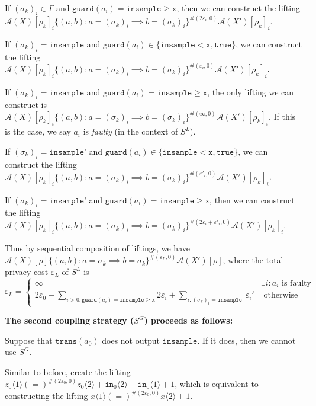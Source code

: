 \documentclass[12pt]{article}
\newcommand{\gguard}[1][x]{\texttt{insample}\geq \texttt{#1}}
\newcommand{\lguard}[1][x]{\texttt{insample} < \texttt{#1}}
\newcommand{\brangle}[1]{\langle #1 \rangle}
\newcommand{\guard}{\texttt{guard}}
\newcommand{\trans}{\texttt{trans}}
\theoremstyle{definition}
\begin{document}
If $(\sigma_k)_i \in \Gamma$ and $\guard(a_i) = \gguard$, then we can construct the lifting $\mathcal{A}(X)[\rho_k]_i\{(a, b): a = (\sigma_k)_i \implies b = (\sigma_k)_i\}^{\#(2\varepsilon_i, 0)}\mathcal{A}(X')[\rho_k]_i$.

If $(\sigma_k)_i = \texttt{insample}$ and $\guard(a_i) \in \{\lguard, \texttt{true}\}$, we can construct the lifting $\mathcal{A}(X)[\rho_k]_i\{(a, b): a = (\sigma_k)_i \implies b = (\sigma_k)_i\}^{\#(\varepsilon_i, 0)}\mathcal{A}(X')[\rho_k]_i$.

If $(\sigma_k)_i = \texttt{insample}$ and $\guard(a_i) = \gguard$, the only lifting we can construct is $\mathcal{A}(X)[\rho_k]_i\{(a, b): a = (\sigma_k)_i \implies b = (\sigma_k)_i\}^{\#(\infty, 0)}\mathcal{A}(X')[\rho_k]_i$. If this is the case, we say $a_i$ is \textit{faulty} (in the context of $S^L$).

If $(\sigma_k)_i =\texttt{insample'}$ and $\guard(a_i) \in \{\lguard, \texttt{true}\}$, we can construct the lifting $\mathcal{A}(X)[\rho_k]_i\{(a, b): a = (\sigma_k)_i \implies b = (\sigma_k)_i\}^{\#(\varepsilon'_i, 0)}\mathcal{A}(X')[\rho_k]_i$.

If $(\sigma_k)_i =\texttt{insample'}$ and $\guard(a_i) = \gguard$, then we can construct the lifting $\mathcal{A}(X)[\rho_k]_i\{(a, b): a = (\sigma_k)_i \implies b = (\sigma_k)_i\}^{\#(2\varepsilon_i+\varepsilon'_i, 0)}\mathcal{A}(X')[\rho_k]_i$.

Thus by sequential composition of liftings, we have $\mathcal{A}(X)[\rho]\{(a, b): a = \sigma_k \implies b = \sigma_k\}^{\#(\varepsilon_L, 0)}\mathcal{A}(X')[\rho]$, where the total privacy cost $\varepsilon_L$ of $S^L$ is \[
	\varepsilon_L= 
	\begin{cases}
		\infty & \exists i: a_i\text{ is faulty}\\
		2\varepsilon_0 + \sum_{i>0: \guard(a_i) = \gguard} 2\varepsilon_i  + \sum_{i: (\sigma_k)_i = \texttt{insample'}}\varepsilon_i'& \text{ otherwise}
	\end{cases}
\]


\textbf{The second coupling strategy ($S^G$) proceeds as follows:} 

Suppose that $\trans(a_0)$ does not output $\texttt{insample}$. If it does, then we cannot use $S^G$.

Similar to before, create the lifting $z_0\brangle{1} (=)^{\#(2\varepsilon_0, 0)} z_0\brangle{2} + \texttt{in}_0\brangle{2}- \texttt{in}_0\brangle{1} + 1$, which is equivalent to constructing the lifting $x\brangle{1} (=)^{\#(2\varepsilon_0, 0)}x\brangle{2}+1$. 
\end{document}
